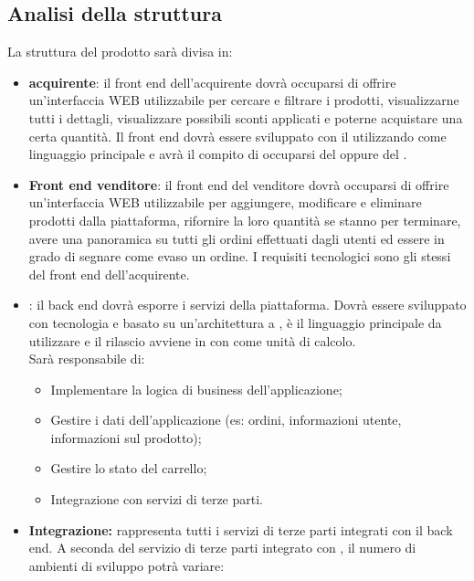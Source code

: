 \subsection{Analisi della struttura}
La struttura del prodotto sarà divisa in:
\begin{itemize}
    \item \textbf{ acquirente}: il front end dell'acquirente dovrà occuparsi di offrire un'interfaccia WEB utilizzabile per cercare e filtrare i prodotti, visualizzarne tutti i dettagli, visualizzare possibili sconti applicati e poterne acquistare una certa quantità. Il front end dovrà essere sviluppato con il   utilizzando come linguaggio principale  e avrà il compito di occuparsi del  oppure del .
    \item \textbf{Front end venditore}: il front end del venditore dovrà occuparsi di offrire un'interfaccia WEB utilizzabile per aggiungere, modificare e eliminare prodotti dalla piattaforma, rifornire la loro quantità se stanno per terminare, avere una panoramica su tutti gli ordini effettuati dagli utenti ed essere in grado di segnare come evaso un ordine. I requisiti tecnologici sono gli stessi del front end dell'acquirente.
    \item \textbf{}: il back end dovrà esporre i servizi della piattaforma. Dovrà essere sviluppato con tecnologia e basato su un'architettura a ,   è il linguaggio principale da utilizzare e il rilascio avviene in  con  come unità di calcolo. \\
    Sarà responsabile di:
    \begin{itemize}
        \item Implementare la logica di business dell'applicazione;
        \item Gestire i dati dell'applicazione (es: ordini, informazioni utente, informazioni sul prodotto);
        \item Gestire lo stato del carrello;
        \item Integrazione con servizi di terze parti.
    \end{itemize}
    \item \textbf{Integrazione:} rappresenta tutti i servizi di terze parti integrati con il back end. A seconda del servizio di terze parti integrato con \NomeProgetto{}, il numero di ambienti di sviluppo potrà variare:

\end{itemize}

